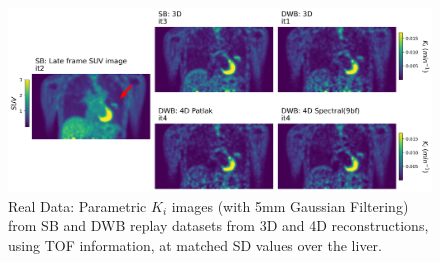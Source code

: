 \begin{figure} [ht!]
\centering
\includegraphics[scale=0.28,angle=0]{3_Results/3_2_Dynamic_Reconstruction_SimulationStudy/figures/RealData/3_5_RealDataExample.png}
\caption{Real Data: Parametric $K_i$ images (with 5mm Gaussian Filtering) from SB and DWB replay datasets from 3D and 4D reconstructions, using TOF information, at matched SD values over the liver.} 
\label{fig:RealKiMontage}
\end{figure} 

